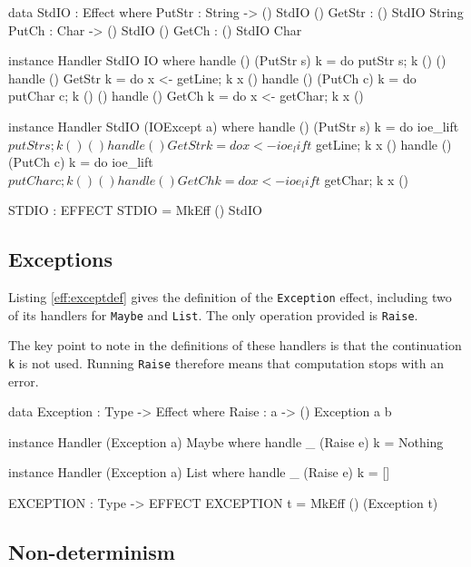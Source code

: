 \begin{code}[float=h,frame=single, caption={Console I/O Effect Definition}, label=eff:stdiodef]
data StdIO : Effect where
     PutStr : String -> { () } StdIO () 
     GetStr : { () } StdIO String 
     PutCh : Char -> { () } StdIO ()
     GetCh : { () } StdIO Char

instance Handler StdIO IO where
    handle () (PutStr s) k = do putStr s; k () ()
    handle () GetStr     k = do x <- getLine; k x ()
    handle () (PutCh c)  k = do putChar c; k () () 
    handle () GetCh      k = do x <- getChar; k x ()

instance Handler StdIO (IOExcept a) where
    handle () (PutStr s) k = do ioe_lift $ putStr s; k () ()
    handle () GetStr     k = do x <- ioe_lift $ getLine; k x ()
    handle () (PutCh c)  k = do ioe_lift $ putChar c; k () () 
    handle () GetCh      k = do x <- ioe_lift $ getChar; k x ()

STDIO : EFFECT
STDIO = MkEff () StdIO
\end{code}

\subsection{Exceptions}

Listing \ref{eff:exceptdef} gives the definition of the \texttt{Exception}
effect, including two of its handlers for \texttt{Maybe} and \texttt{List}.
The only operation provided is \texttt{Raise}. 

The key point to note in the definitions of these handlers is that the
continuation \texttt{k} is not used. Running \texttt{Raise} therefore means
that computation stops with an error.

\begin{code}[float=h,frame=single, caption={Exception Effect Definition}, label=eff:exceptdef]
data Exception : Type -> Effect where 
     Raise : a -> { () } Exception a b

instance Handler (Exception a) Maybe where
     handle _ (Raise e) k = Nothing

instance Handler (Exception a) List where
     handle _ (Raise e) k = []

EXCEPTION : Type -> EFFECT
EXCEPTION t = MkEff () (Exception t)
\end{code}

\subsection{Non-determinism}

